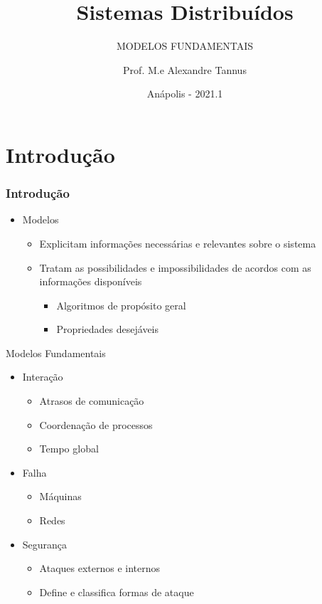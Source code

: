 \documentclass[aspectratio=169,
				xcolor=table]{beamer}
\institute[]{\uppercase{Engenharia de Software}}
\title[]{Sistemas Distribuídos}
\subtitle[]{\uppercase{Modelos Fundamentais}}
\author[]{Prof. M.e Alexandre Tannus}
\date{Anápolis - 2021.1}
\begin{document}
	\begin{frame}
		\titlepage		
	\end{frame}

	\begin{frame}
		\tableofcontents
	\end{frame}	

	\section{Introdução}
	\begin{frame}
		\frametitle{Introdução}
		\begin{itemize}
			\item Modelos
			\begin{itemize}
				\item Explicitam informações necessárias e relevantes sobre o sistema
				\item Tratam as possibilidades e impossibilidades de acordos com as informações disponíveis
				\begin{itemize}
					\item Algoritmos de propósito geral
					\item Propriedades  desejáveis
				\end{itemize}
			\end{itemize}
		\end{itemize}		
	\end{frame}

	\begin{frame}{Modelos Fundamentais}
		\begin{itemize}
			\item Interação
			\begin{itemize}
				\item Atrasos de comunicação
				\item Coordenação de processos
				\item Tempo global
			\end{itemize}
			\vspace{0.7em}
			\item Falha
			\begin{itemize}
				\item Máquinas
				\item Redes
			\end{itemize}
			\vspace{0.7em}
			\item Segurança
			\begin{itemize}
				\item Ataques externos e internos
				\item Define e classifica formas de ataque
			\end{itemize}
		\end{itemize}
	\end{frame}
	
\end{document}
